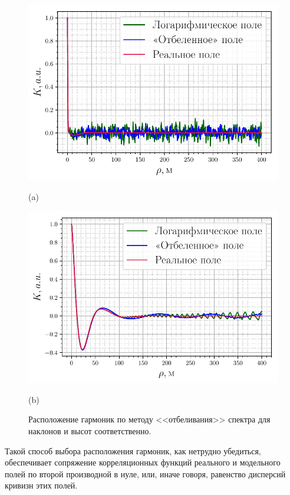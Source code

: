 \documentclass[a4paper,14pt]{extarticle}
\begin{document}
\begin{figure}[h!]
    \centering
    \begin{minipage}{0.49\linewidth}
    \centering
    \includegraphics[width=\linewidth]{fig/correlation_angles_wa}

        (a)
    \end{minipage}
    \begin{minipage}{0.49\linewidth}
        \centering
        \includegraphics[width=\linewidth]{fig/correlation_height_wa}

        (b)
    \end{minipage}
    \caption{ Расположение гармоник по методу <<отбеливания>> спектра для
    наклонов и высот соответственно. }
    \label{fig:nodes}
\end{figure}

Такой способ выбора расположения гармоник, как нетрудно убедиться, обеспечивает
сопряжение корреляционных функций реального и модельного полей по второй
производной в нуле, или, иначе говоря, равенство дисперсий кривизн этих
полей.
\end{document}
